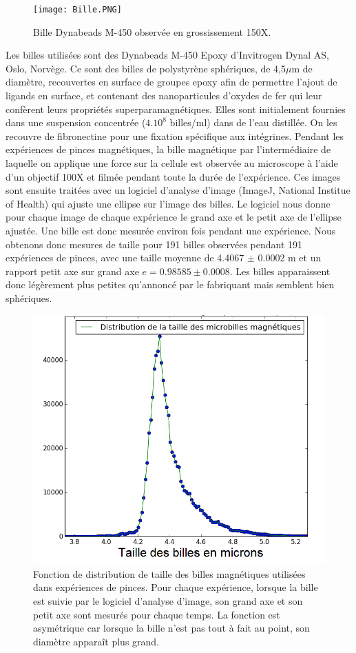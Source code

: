 		\begin{figure}
		\texttt{[image: Bille.PNG]}
		\caption{Bille Dynabeads M-450 observée en grossissement 150X. }
		\end{figure}
		Les billes utilisées sont des Dynabeads M-450 Epoxy d'Invitrogen Dynal AS, Oslo, Norvège. 
		Ce sont des billes de polystyrène sphériques, de 4,5$\mu$m de diamètre, recouvertes en surface de groupes epoxy afin de permettre l'ajout de ligands en surface, et contenant des nanoparticules d'oxydes de fer qui leur confèrent leurs propriétés superparamagnétiques. 
		Elles sont initialement fournies dans une suspension concentrée ($4.10^8$ billes/ml) dans de l'eau distillée. On les recouvre de fibronectine pour une fixation spécifique aux intégrines.
		Pendant les expériences de pinces magnétiques, la bille magnétique par l'intermédiaire de laquelle on applique une force sur la cellule est observée au microscope à l'aide d'un objectif 100X et filmée pendant toute la durée de l'expérience.  Ces images sont ensuite traitées avec un logiciel d'analyse d'image (ImageJ, National Institue of Health) qui ajuste une ellipse sur l'image des billes. Le logiciel nous donne pour chaque image de chaque expérience le grand axe et le petit axe de l'ellipse ajustée. Une bille est donc mesurée environ  fois pendant une expérience.  
		Nous obtenons donc  mesures de taille pour 191 billes observées pendant 191 expériences de pinces, avec une taille moyenne de 4.4067 $\pm$ 0.0002 \micro m et un rapport petit axe sur grand axe $e=0.98585 \pm 0.0008$. Les billes apparaissent donc légèrement plus petites qu'annoncé par le fabriquant mais semblent bien sphériques.
		\begin{figure}
		\includegraphics[scale=0.3]{Taille_des_billes.png}
		\caption{Fonction de distribution de taille des billes magnétiques utilisées dans  expériences de pinces. Pour chaque expérience, lorsque la bille est suivie par le logiciel d'analyse d'image, son grand axe et son petit axe sont mesurés pour chaque temps. La fonction est asymétrique car lorsque la bille n'est pas tout à fait au point, son diamètre apparaît plus grand.}
\end{figure}		 
		
